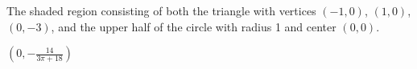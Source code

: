 {The shaded region consisting of both the triangle with vertices $(-1,0)$, $(1,0)$, $(0,-3)$, and the upper half of the circle with radius 1 and center $(0,0)$.\\

\noindent\begin{minipage}{\linewidth}
\centering
{}
\end{minipage}
}
{$\left( 0, -\frac{14}{3\pi+18} \right)$
}
